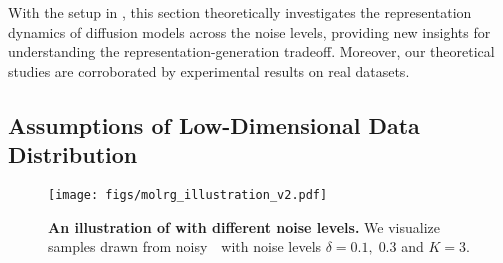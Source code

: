 



With the setup in , this section theoretically investigates the representation dynamics of diffusion models across the noise levels, providing new insights for understanding the representation-generation tradeoff. Moreover, our theoretical studies are corroborated by experimental results on real datasets.






\subsection{Assumptions of Low-Dimensional Data Distribution}\label{subsec:model}

\begin{wrapfigure}[14]{R}{0.44\textwidth}
    \vspace{-0.1in}
    \begin{center}
    \texttt{[image: figs/molrg\_illustration\_v2.pdf]}
    \end{center}
    \vspace{-0.25in}
    \caption{\textbf{An illustration of \MoLRG\;with different noise levels.} We visualize samples drawn from noisy~\MoLRG~with noise levels $\delta = 0.1,\;0.3$ and $K=3$.}
    \label{fig:sample}
    \vspace{-0.1in}
\end{wrapfigure}

